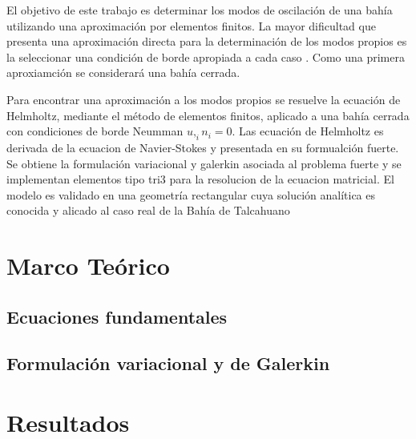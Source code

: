 \documentclass[12pt, letterpaper]{article}
\begin{document}
El objetivo de este trabajo es determinar los modos de oscilaci\'on de una bah\'ia utilizando una aproximaci\'on por elementos finitos. La mayor dificultad que presenta una aproximaci\'on directa para la determinaci\'on de los modos propios es la seleccionar una condici\'on de borde apropiada a cada caso \cite{Mei2005, Rabino2009}. Como una primera aproxiamci\'on se considerar\'a una bah\'ia cerrada.

Para encontrar una aproximaci\'on a los modos propios se resuelve la ecuaci\'on de Helmholtz, mediante el m\'etodo de elementos finitos, aplicado a una bah\'ia cerrada con condiciones de borde Neumman $u,_i  n_i = 0$. Las ecuaci\'on de Helmholtz es derivada de la ecuacion de Navier-Stokes y presentada en su formualci\'on fuerte. Se obtiene la formulaci\'on variacional y galerkin asociada al problema fuerte y se implementan elementos tipo tri3 para la resolucion de la ecuacion matricial. El modelo es validado en una geometr\'ia rectangular cuya soluci\'on anal\'itica es conocida y alicado al caso real de la Bah\'ia de Talcahuano


\section{Marco Te\'orico}
  \subsection{Ecuaciones fundamentales}
  \label{subsec:ecuaciones}
  
  \subsection{Formulaci\'on variacional y de Galerkin}
  
\section{Resultados}
  
  
%   
\end{document}

